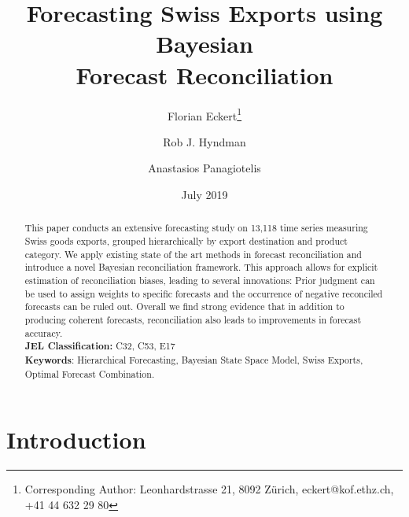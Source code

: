 \documentclass[a4paper,fleqn,11pt]{article}
\begin{document}
\title{\huge Forecasting Swiss Exports using Bayesian \\Forecast Reconciliation}

\author[$\dagger$]{Florian Eckert\thanks{Corresponding Author: Leonhardstrasse 21, 8092 Zürich, eckert@kof.ethz.ch, +41 44 632 29 80}}
\author[$\ddagger$]{Rob J. Hyndman}
\author[$\ddagger$]{Anastasios Panagiotelis}
\date{July 2019}

\clearpage\maketitle
\thispagestyle{empty}

\begin{abstract}
	\noindent This paper conducts an extensive forecasting study on 13,118 time series measuring Swiss goods exports, grouped hierarchically by export destination and product category.  We apply existing state of the art methods in forecast reconciliation and introduce a novel Bayesian reconciliation framework. This approach allows for explicit estimation of reconciliation biases, leading to several innovations: Prior judgment can be used to assign weights to specific forecasts and the occurrence of negative reconciled forecasts can be ruled out. Overall we find strong evidence that in addition to producing coherent forecasts, reconciliation also leads to improvements in forecast accuracy.\\
	
	\noindent \textbf{JEL Classification:} C32, C53, E17\\
	\noindent \textbf{Keywords}: Hierarchical Forecasting, Bayesian State Space Model, Swiss Exports, Optimal Forecast Combination.
\end{abstract}
\clearpage
\setcounter{page}{1}

\section{Introduction}\label{sec:intro}
\end{document}
